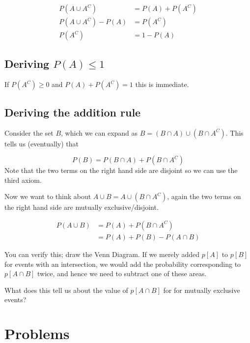 \documentclass[12pt]{extbook}
\begin{document}
\begin{align*}
P(A \cup A^C) &= P(A) + P(A^C) \\
P(A \cup A^C) - P(A) &= P(A^C) \\
P(A^C) &= 1 - P(A)
\end{align*}

\subsection{Deriving $P(A) \leq 1$}

If $P(A^C) \geq 0$ and $P(A) + P(A^C) = 1$ this is immediate.

\subsection{Deriving the addition rule}

Consider the set $B$, which we can expand as $B=(B \cap A) \cup (B \cap A^C)$.   This tells us (eventually) that

\begin{displaymath}
P(B) = P(B \cap A) + P(B \cap A^C)
\end{displaymath}
Note that the two terms on the right hand side are disjoint so we can use the third axiom.

Now we want to think about $A \cup B = A \cup (B \cap A^C)$, again the two terms on the right hand side are mutually exclusive/disjoint.   

\begin{align*}
P(A \cup B) &= P(A) + P(B \cap A^C) \\
 &= P(A) + P(B) - P(A \cap B)
 \end{align*}



You can verify this; draw the Venn Diagram.   If we merely added $p[A]$ to $p[B]$ for events with an intersection, we would add the probability corresponding to $p[A \cap B]$ twice, and hence we need to subtract one of these areas.

{\color{green}What does this tell us about the value of $p[A \cap B]$ for for mutually exclusive events?}


\section{Problems}
\begin{enumerate}







\end{enumerate}
\end{document}
